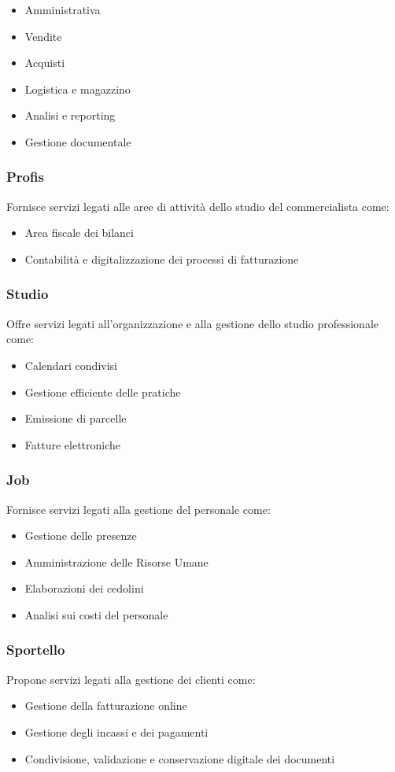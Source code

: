 \begin{itemize}
    \item Amministrativa 
    \item Vendite 
    \item Acquisti 
    \item Logistica e magazzino
    \item Analisi e reporting
    \item Gestione documentale
\end{itemize}

\subsubsection*{Profis}
Fornisce servizi legati alle aree di attività dello studio del commercialista come: 
\begin{itemize}
    \item Area fiscale dei bilanci 
    \item Contabilità e digitalizzazione dei processi di fatturazione  
\end{itemize}

\subsubsection*{Studio}
Offre servizi legati all'organizzazione e alla gestione dello studio professionale come:
\begin{itemize}
    \item Calendari condivisi  
    \item Gestione efficiente delle pratiche 
    \item Emissione di parcelle  
    \item Fatture elettroniche 
\end{itemize}

\subsubsection*{Job}
Fornisce servizi legati alla gestione del personale come: 
\begin{itemize}
    \item Gestione delle presenze  
    \item Amministrazione delle Risorse Umane  
    \item Elaborazioni dei cedolini 
    \item Analisi sui costi del personale
\end{itemize}

\subsubsection*{Sportello}
Propone servizi legati alla gestione dei clienti come:  
\begin{itemize}
    \item Gestione della fatturazione online 
    \item Gestione degli incassi e dei pagamenti 
    \item Condivisione, validazione e conservazione digitale dei documenti  
\end{itemize}

